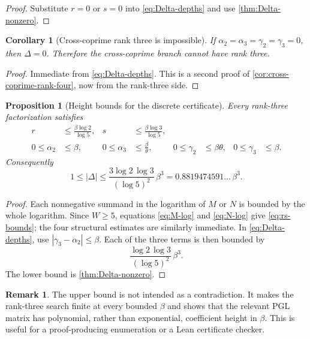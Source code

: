 \documentclass[11pt,oneside]{article}
\theoremstyle{research}
\newtheorem{proposition}[theorem]{Proposition}
\newtheorem{corollary}[theorem]{Corollary}
\theoremstyle{definition}
\newtheorem{remark}[theorem]{Remark}
\begin{document}
\begin{proof}
Substitute $r=0$ or $s=0$ into \eqref{eq:Delta-depths} and use
\cref{thm:Delta-nonzero}.
\end{proof}

\begin{corollary}[Cross-coprime rank three is impossible]
\label{cor:cross-coprime-no-rank3}
If $\alpha_2=\alpha_3=\gamma_2=\gamma_3=0$, then $\Delta=0$.  Therefore the
cross-coprime branch cannot have rank three.
\end{corollary}

\begin{proof}
Immediate from \eqref{eq:Delta-depths}.  This is a second proof of
\cref{cor:cross-coprime-rank-four}, now from the rank-three side.
\end{proof}

\begin{proposition}[Height bounds for the discrete certificate]
\label{prop:Delta-height}
Every rank-three factorization satisfies
\begin{align}
 r&\le\frac{\beta\log2}{\log5},&
 s&\le\frac{\beta\log3}{\log5},
 \label{eq:rs-bounds}\\
 0\le\alpha_2&\le\beta,&
 0\le\alpha_3&\le\frac\beta\theta,&
 0\le\gamma_2&\le\beta\theta,&
 0\le\gamma_3&\le\beta.
 \label{eq:depth-bounds}
\end{align}
Consequently
\begin{equation}
 1\le|\Delta|
 \le \frac{3\log2\,\log3}{(\log5)^2}\,\beta^3
 =0.8819474591\ldots\,\beta^3.
 \label{eq:Delta-height-bound}
\end{equation}
\end{proposition}

\begin{proof}
Each nonnegative summand in the logarithm of $M$ or $N$ is bounded by the
whole logarithm.  Since $W\ge5$, equations \eqref{eq:M-log} and
\eqref{eq:N-log} give \eqref{eq:rs-bounds}; the four structural estimates are
similarly immediate.  In \eqref{eq:Delta-depths}, use
$|\gamma_3-\alpha_2|\le\beta$.  Each of the three terms is then bounded by
\[
 \frac{\log2\,\log3}{(\log5)^2}\,\beta^3.
\]
The lower bound is \cref{thm:Delta-nonzero}.
\end{proof}

\begin{remark}
The upper bound is not intended as a contradiction.  It makes the rank-three
search finite at every bounded $\beta$ and shows that the relevant PGL matrix
has polynomial, rather than exponential, coefficient height in $\beta$.  This
is useful for a proof-producing enumeration or a Lean certificate checker.
\end{remark}
\end{document}
